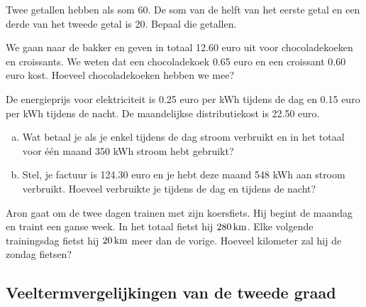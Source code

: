 \documentclass[12pt]{article}
\begin{document}
\begin{oefening}
Twee getallen hebben als som 60. De som van de helft van het eerste getal en een derde van het tweede getal is 20. Bepaal die getallen.
\end{oefening}

\begin{oefening}
We gaan naar de bakker en geven in totaal 12.60 euro uit voor chocoladekoeken en croissants. We weten dat een chocoladekoek 0.65 euro en een croissant 0.60 euro kost. Hoeveel chocoladekoeken hebben we mee?
\end{oefening}

\begin{oefening}
De energieprijs voor elektriciteit is 0.25 euro per kWh tijdens de dag en 0.15 euro per kWh tijdens de nacht. De maandelijkse distributiekost is 22.50 euro.
\begin{enumerate}[(a)]
  \item Wat betaal je als je enkel tijdens de dag stroom verbruikt en in het totaal voor één maand 350 kWh stroom hebt gebruikt?
  \item Stel, je factuur is 124.30 euro en je hebt deze maand 548 kWh aan stroom verbruikt. Hoeveel verbruikte je tijdens de dag en tijdens de nacht?
\end{enumerate}
\end{oefening}

\begin{oefening}
Aron gaat om de twee dagen trainen met zijn koersfiets. Hij begint de maandag en traint een ganse week. In het totaal fietst hij $280 \km$. Elke volgende trainingsdag fietst hij $20 \km$ meer dan de vorige. Hoeveel kilometer zal hij de zondag fietsen?
\end{oefening}

\vfill
\hfill
{}



\pagebreak
\subsection{Veeltermvergelijkingen van de tweede graad}
\end{document}
